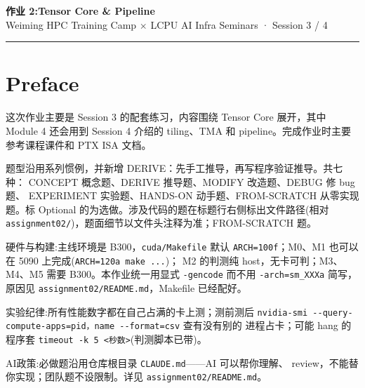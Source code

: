 \documentclass[11pt,a4paper,fontset=fandol]{ctexart}
\begin{document}
\begin{center}
  {\LARGE\bfseries 作业 2:Tensor Core \& Pipeline}\\[6pt]
  {\sffamily Weiming HPC Training Camp \(\times\) LCPU AI Infra Seminars
· Session 3 / 4}
\end{center}

\vspace{0.5em}
\hrule
\vspace{1em}

\setcounter{section}{-1}

\section*{Preface}\label{preface}

这次作业主要是 Session 3 的配套练习，内容围绕 Tensor Core 展开，其中
Module 4 还会用到 Session 4 介绍的 tiling、TMA 和
pipeline。完成作业时主要参考课程课件和 PTX ISA 文档。

题型沿用系列惯例，并新增 DERIVE：先手工推导，再写程序验证推导。共七种：
CONCEPT 概念题、DERIVE 推导题、MODIFY 改造题、DEBUG 修 bug 题、
EXPERIMENT 实验题、HANDS-ON 动手题、FROM-SCRATCH 从零实现题。标 Optional
的为选做。涉及代码的题在标题行右侧标出文件路径(相对
\texttt{assignment02/\allowbreak{}})，题面细节以文件头注释为准；FROM-SCRATCH
题。

硬件与构建:主线环境是 B300，\texttt{cuda/\allowbreak{}Makefile} 默认
\texttt{ARCH=\allowbreak{}100f}；M0、M1 也可以在 5090
上完成(\texttt{ARCH=\allowbreak{}120a\ make\ .\allowbreak{}.\allowbreak{}.\allowbreak{}})；
M2 的判测纯 host，无卡可判；M3、M4、M5 需要 B300。本作业统一用显式
\texttt{-\allowbreak{}gencode} 而不用
\texttt{-\allowbreak{}arch=\allowbreak{}sm\_\allowbreak{}XXXa}
简写，原因见
\texttt{assignment02/\allowbreak{}README.\allowbreak{}md}，Makefile
已经配好。

实验纪律:所有性能数字都在自己占满的卡上测；测前测后
\texttt{nvidia-\allowbreak{}smi\ -\allowbreak{}\/\allowbreak{}-\allowbreak{}query-\allowbreak{}compute-\allowbreak{}apps=\allowbreak{}pid，name\ -\allowbreak{}\/\allowbreak{}-\allowbreak{}format=\allowbreak{}csv}
查有没有别的 进程占卡；可能 hang 的程序套
\texttt{timeout\ -\allowbreak{}k\ 5\ \textless{}秒数\textgreater{}}(判测脚本已带)。

AI政策:必做题沿用仓库根目录 \texttt{CLAUDE.\allowbreak{}md}------AI
可以帮你理解、 review，不能替你实现；团队题不设限制。详见
\texttt{assignment02/\allowbreak{}README.\allowbreak{}md}。
\end{document}

